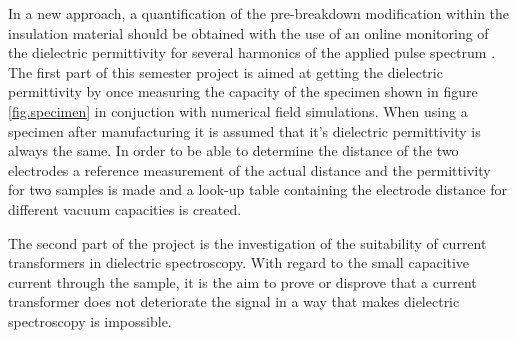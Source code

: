 In a new approach, a quantification of the pre-breakdown modification within the insulation material should be obtained with the use of an online monitoring of the dielectric permittivity for several harmonics of the applied pulse spectrum \cite{FaerberMVISS}.
The first part of this semester project is aimed at getting the dielectric permittivity by once measuring the capacity of the specimen shown in figure \ref{fig.specimen} in conjuction with numerical field simulations. When using a specimen after manufacturing it is assumed that it's dielectric permittivity is always the same. In order to be able to determine the distance of the two electrodes a reference measurement of the actual distance and the permittivity for two samples is made and a look-up table containing the electrode distance for different vacuum capacities is created. 

The second part of the project is the investigation of the suitability of current transformers in dielectric spectroscopy. With regard to the small capacitive current through the sample, it is the aim to prove or disprove that a current transformer does not deteriorate the signal in a way that makes dielectric spectroscopy is impossible. 


